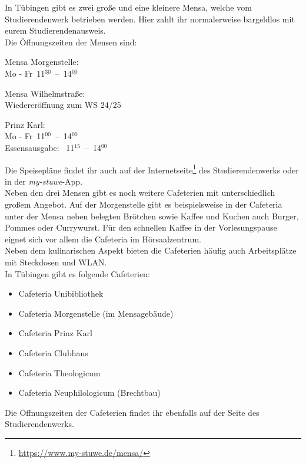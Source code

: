 
In Tübingen gibt es zwei große und eine kleinere Mensa, welche vom
Studierendenwerk betrieben werden. Hier zahlt ihr normalerweise bargeldlos mit
eurem Studierendenausweis.\\ Die Öffnungszeiten der Mensen sind:
\begin{center}

Mensa Morgenstelle:\\
Mo - Fr~11$^{\underline{30}}$~--~14$^{\underline{00}}$

\bigskip

Mensa Wilhelmstraße:\\
Wiedereröffnung zum WS 24/25 %

\bigskip

\nopagebreak
Prinz Karl:\\
Mo - Fr~11$^{\underline{00}}$~--~14$^{\underline{00}}$\\
Essensausgabe: ~11$^{\underline{15}}$~--~14$^{\underline{00}}$

\end{center}

Die Speisepläne findet ihr auch auf der
Internetseite\footnote{\url{https://www.my-stuwe.de/mensa/}} des
Studierendenwerks oder in der \emph{my-stuwe}-App.\\

Neben den drei Mensen gibt es noch weitere Cafeterien mit unterschiedlich
großem Angebot. Auf der Morgenstelle gibt es beispielsweise in der Cafeteria
unter der Mensa neben belegten Brötchen sowie Kaffee und Kuchen auch Burger,
Pommes oder Currywurst. Für den schnellen Kaffee in der Vorlesungspause eignet
sich vor allem die Cafeteria im Hörsaalzentrum.\\ Neben dem kulinarischen
Aspekt bieten die Cafeterien häufig auch Arbeitsplätze mit Steckdosen und
WLAN.\\
In Tübingen gibt es folgende Cafeterien:
\begin{itemize}
	\setlength\itemsep{0.3em}
	\item Cafeteria Unibibliothek
	\item Cafeteria Morgenstelle (im Mensagebäude)
	\item Cafeteria Prinz Karl
	\item Cafeteria Clubhaus
	\item Cafeteria Theologicum
	\item Cafeteria Neuphilologicum (Brechtbau)
\end{itemize} Die Öffnungszeiten der Cafeterien findet ihr ebenfalls auf der
Seite des Studierendenwerks.
